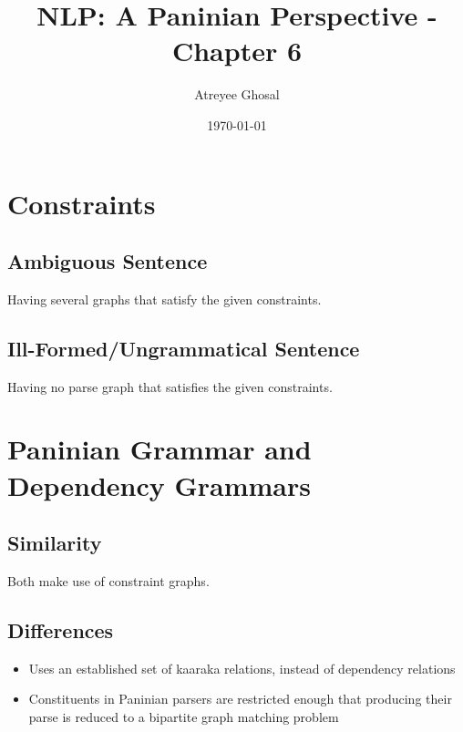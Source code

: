 \documentclass[11pt]{article}
\author{Atreyee Ghosal}
\date{\today}
\title{NLP: A Paninian Perspective - Chapter 6}
\begin{document}
\maketitle
\tableofcontents



\section{Constraints}
\label{sec:org1b194a5}

\subsection{Ambiguous Sentence}
\label{sec:org185cb66}

Having several graphs that satisfy the given constraints.

\subsection{Ill-Formed/Ungrammatical Sentence}
\label{sec:org8a25d96}

Having no parse graph that satisfies the given constraints.

\section{Paninian Grammar and Dependency Grammars}
\label{sec:org430d446}

\subsection{Similarity}
\label{sec:orgaa324b1}

Both make use of constraint graphs.

\subsection{Differences}
\label{sec:org2638623}

\begin{itemize}
\item Uses an established set of kaaraka relations, instead of dependency relations
\item Constituents in Paninian parsers are restricted enough that producing their parse is reduced to a bipartite graph matching problem
\end{itemize}
\end{document}
